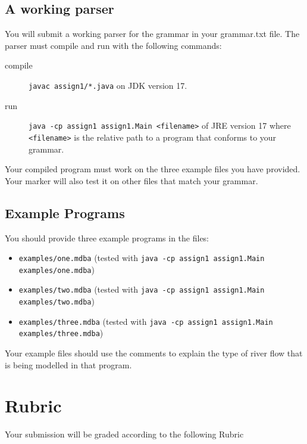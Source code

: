 \documentclass[twoside=false, DIV=14]{scrartcl}
\begin{document}
\subsection{A working parser}
You will submit a working parser for the grammar in your grammar.txt file.  The parser must compile and run with the following commands:
\begin{description}
\item[compile] \lstinline|javac assign1/*.java| on JDK version 17.
\item[run] \lstinline|java -cp assign1 assign1.Main <filename>| of JRE version 17 where \lstinline|<filename>| is the relative path to a program that conforms to your grammar.
\end{description}

Your compiled program must work on the three example files you have provided.  Your marker will also test it on other files that match your grammar.

\subsection{Example Programs}
You should provide three example programs in the files:
\begin{itemize}
\item \lstinline+examples/one.mdba+ (tested with \lstinline|java -cp assign1 assign1.Main examples/one.mdba|)
\item \lstinline+examples/two.mdba+ (tested with \lstinline|java -cp assign1 assign1.Main examples/two.mdba|)
\item \lstinline+examples/three.mdba+ (tested with \lstinline|java -cp assign1 assign1.Main examples/three.mdba|)
\end{itemize}

Your example files should use the comments to explain the type of river flow that is being modelled in that program.

\section{Rubric}
Your submission will be graded according to the following Rubric
\end{document}

